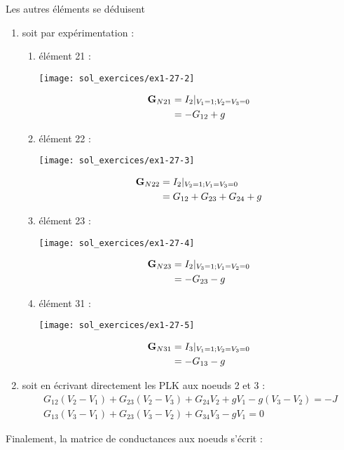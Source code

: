 Les autres éléments se déduisent 
\begin{enumerate}
	\item soit par expérimentation :
	\begin{enumerate}
		\item élément 21 : 
		
		\parbox{6cm}{\texttt{[image: sol\_exercices/ex1-27-2]}}
		\parbox{4cm}{\begin{align*}
			{\bf G}_{N21}&=I_2|_{V_1=1;V_2=V_3=0}\\
			& = -G_{12}+g
			\end{align*}}
		\item  élément 22 :
		
		\parbox{6cm}{\texttt{[image: sol\_exercices/ex1-27-3]}}
		\parbox{4cm}{\begin{align*}
			{\bf G}_{N22}&=I_2|_{V_2=1;V_1=V_3=0}\\
			& = G_{12}+G_{23}+G_{24}+g
			\end{align*}}
		\item  élément 23 :
		
		\parbox{6cm}{\texttt{[image: sol\_exercices/ex1-27-4]}}
		\parbox{4cm}{\begin{align*}
			{\bf G}_{N23}&=I_2|_{V_3=1;V_1=V_2=0}\\
			& = -G_{23}-g
			\end{align*}}
		\item  élément 31 :
		
		\parbox{6cm}{\texttt{[image: sol\_exercices/ex1-27-5]}}
		\parbox{4cm}{\begin{align*}
			{\bf G}_{N31}&=I_3|_{V_1=1;V_2=V_3=0}\\
			& = -G_{13}-g
			\end{align*}}
	\end{enumerate}
	\item soit en écrivant directement les PLK aux noeuds 2 et 3 :
	\begin{gather*}
	G_{12}(V_2-V_1)+G_{23}(V_2-V_3)+G_{24}V_2+gV_1-g(V_3-V_2)=-J\\
	G_{13}(V_3-V_1)+G_{23}(V_3-V_2)+G_{34}V_3-gV_1=0
	\end{gather*}
\end{enumerate}

Finalement, la matrice de conductances aux noeuds s'écrit :


